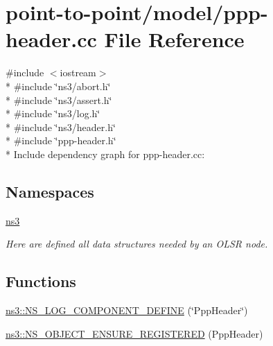 \hypertarget{ppp-header_8cc}{}\section{point-\/to-\/point/model/ppp-\/header.cc File Reference}
\label{ppp-header_8cc}
{\ttfamily \#include $<$iostream$>$}\\*
{\ttfamily \#include \char`\"{}ns3/abort.\+h\char`\"{}}\\*
{\ttfamily \#include \char`\"{}ns3/assert.\+h\char`\"{}}\\*
{\ttfamily \#include \char`\"{}ns3/log.\+h\char`\"{}}\\*
{\ttfamily \#include \char`\"{}ns3/header.\+h\char`\"{}}\\*
{\ttfamily \#include \char`\"{}ppp-\/header.\+h\char`\"{}}\\*
Include dependency graph for ppp-\/header.cc\+:
\subsection*{Namespaces}
\begin{DoxyCompactItemize}
\item 
 \hyperlink{namespacens3}{ns3}
\begin{DoxyCompactList}\small\item\em Here are defined all data structures needed by an O\+L\+SR node. \end{DoxyCompactList}\end{DoxyCompactItemize}
\subsection*{Functions}
\begin{DoxyCompactItemize}
\item 
\hyperlink{namespacens3_aa974921f8ae060b7b9e4ae1526629ad4}{ns3\+::\+N\+S\+\_\+\+L\+O\+G\+\_\+\+C\+O\+M\+P\+O\+N\+E\+N\+T\+\_\+\+D\+E\+F\+I\+NE} (\char`\"{}Ppp\+Header\char`\"{})
\item 
\hyperlink{namespacens3_a93c25ce64df10deb988f979ec12069cd}{ns3\+::\+N\+S\+\_\+\+O\+B\+J\+E\+C\+T\+\_\+\+E\+N\+S\+U\+R\+E\+\_\+\+R\+E\+G\+I\+S\+T\+E\+R\+ED} (Ppp\+Header)
\end{DoxyCompactItemize}

